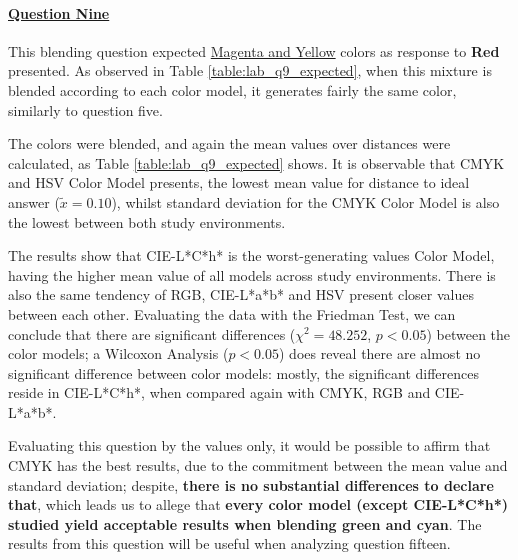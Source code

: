 \paragraph{\ul{Question Nine}}
%
This blending question expected \ul{Magenta and Yellow} colors as response to \textbf{Red} presented. As observed in Table \ref{table:lab_q9_expected}, when this mixture is blended according
to each color model, it generates fairly the same color, similarly to question five. \par
%
The colors were blended, and again the mean values over distances were calculated, as Table \ref{table:lab_q9_expected} shows. It is observable that CMYK and HSV Color Model presents,
the lowest mean value for distance to ideal answer ($\tilde{x} = 0.10$), whilst standard deviation for the CMYK Color Model is also the lowest between both study environments. \par
%
The results show that CIE-L*C*h* is the worst-generating values Color Model, having the higher mean value of all models across study environments. There is also the same tendency of RGB,
CIE-L*a*b* and HSV present closer values between each other. Evaluating the data with the Friedman Test, we can conclude that there are significant differences ($\chi^2 = 48.252$, $p < 0.05$)
between the color models; a Wilcoxon Analysis ($p < 0.05$) does reveal there are almost no significant difference between color models: mostly, the significant differences reside in CIE-L*C*h*, when
compared again with CMYK, RGB and CIE-L*a*b*. \par
%
Evaluating this question by the values only, it would be possible to affirm that CMYK has the best results, due to the commitment between the mean value and standard deviation; despite,
\textbf{there is no substantial differences to declare that}, which leads us to allege that \textbf{every color model (except CIE-L*C*h*) studied yield acceptable results when blending green and cyan}.
%
The results from this question will be useful when analyzing question fifteen.
%
